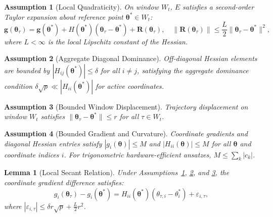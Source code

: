 \documentclass[sn-mathphys,Numbered]{sn-jnl}
\theoremstyle{thmstyleone}
\newtheorem{lemma}{Lemma}
\theoremstyle{thmstyletwo}
\theoremstyle{thmstylethree}
\newtheorem{assumption}{Assumption}
\begin{document}
\begin{assumption}[Local Quadraticity]
\label{ass:quadraticity}
On window $W_t$, $E$ satisfies a second-order Taylor expansion about reference point $\boldsymbol{\theta}^* \in W_t$:
\begin{equation}
\mathbf{g}(\boldsymbol{\theta}_\tau) = \mathbf{g}(\boldsymbol{\theta}^*) + H(\boldsymbol{\theta}^*)(\boldsymbol{\theta}_\tau - \boldsymbol{\theta}^*) + \mathbf{R}(\boldsymbol{\theta}_\tau), \quad \|\mathbf{R}(\boldsymbol{\theta}_\tau)\| \le \frac{L}{2} \|\boldsymbol{\theta}_\tau - \boldsymbol{\theta}^*\|^2,
\end{equation}
where $L < \infty$ is the local Lipschitz constant of the Hessian.
\end{assumption}

\begin{assumption}[Aggregate Diagonal Dominance]
\label{ass:diag_dominance}
Off-diagonal Hessian elements are bounded by $|H_{ij}(\boldsymbol{\theta}^*)| \le \delta$ for all $i \ne j$, satisfying the aggregate dominance condition $\delta \sqrt{p} \ll |H_{ii}(\boldsymbol{\theta}^*)|$ for active coordinates.
\end{assumption}

\begin{assumption}[Bounded Window Displacement]
\label{ass:displacement}
Trajectory displacement on window $W_t$ satisfies $\|\boldsymbol{\theta}_\tau - \boldsymbol{\theta}^*\| \le r$ for all $\tau \in W_t$.
\end{assumption}

\begin{assumption}[Bounded Gradient and Curvature]
\label{ass:bounded_curvature}
Coordinate gradients and diagonal Hessian entries satisfy $|g_i(\boldsymbol{\theta})| \le M$ and $|H_{ii}(\boldsymbol{\theta})| \le M$ for all $\boldsymbol{\theta}$ and coordinate indices $i$. For trigonometric hardware-efficient ansatzes, $M \le \sum_k |c_k|$.
\end{assumption}

\begin{lemma}[Local Secant Relation]
\label{lem:secant}
Under Assumptions~\ref{ass:quadraticity}, \ref{ass:diag_dominance}, and \ref{ass:displacement}, the coordinate gradient difference satisfies:
\begin{equation}
g_i(\boldsymbol{\theta}_\tau) - g_i(\boldsymbol{\theta}^*) = H_{ii}(\boldsymbol{\theta}^*)(\theta_{\tau,i} - \theta_i^*) + \varepsilon_{i,\tau},
\end{equation}
where $|\varepsilon_{i,\tau}| \le \delta r \sqrt{p} + \frac{L}{2} r^2$.
\end{lemma}
\end{document}
